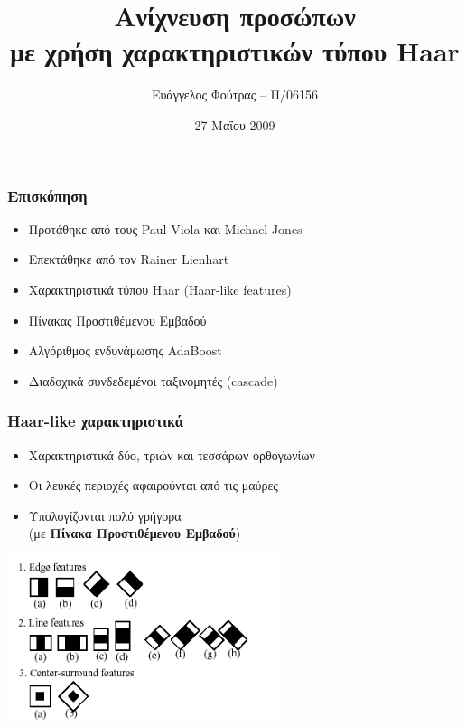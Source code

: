 \documentclass{beamer}
\title[Ανίχνευση προσώπων με Haar-like χαρακτηριστικά]{Ανίχνευση προσώπων\\με χρήση χαρακτηριστικών
	τύπου Haar}
\author{Ευάγγελος Φούτρας -- Π/06156}
\institute{Πανεπιστήμιο Πειραιώς}
\date{27 Μαΐου 2009}
\begin{document}
\begin{frame}
\titlepage
\end{frame}

\begin{frame}
\frametitle{Επισκόπηση}
\begin{itemize}
\item Προτάθηκε από τους Paul Viola και Michael Jones
\item Επεκτάθηκε από τον Rainer Lienhart
\item Χαρακτηριστικά τύπου Haar (Haar-like features)
\item Πίνακας Προστιθέμενου Εμβαδού
\item Αλγόριθμος ενδυνάμωσης AdaBoost
\item Διαδοχικά συνδεδεμένοι ταξινομητές (cascade)
\end{itemize}
\end{frame}

\begin{frame}
\frametitle{Haar-like χαρακτηριστικά}
\begin{itemize}
\item Χαρακτηριστικά δύο, τριών και τεσσάρων ορθογωνίων
\item Οι λευκές περιοχές αφαιρούνται από τις μαύρες
\item Υπολογίζονται πολύ γρήγορα\\
	(με \textbf{Πίνακα Προστιθέμενου Εμβαδού})
\end{itemize}

\begin{center}
\includegraphics[width=0.6\textwidth]{images/feature-types}
\end{center}
\end{frame}
\end{document}
